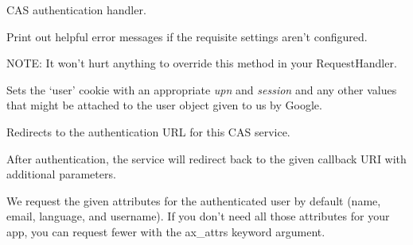 \documentclass[letterpaper,10pt,openany]{sphinxmanual}
\begin{document}
\begin{fulllineitems}
\label{Developer/authentication:gateone.auth.authentication.CASAuthHandler}
CAS authentication handler.

\begin{fulllineitems}
\label{Developer/authentication:gateone.auth.authentication.CASAuthHandler.initialize}
Print out helpful error messages if the requisite settings aren't
configured.

NOTE: It won't hurt anything to override this method in your
RequestHandler.

\end{fulllineitems}


\begin{fulllineitems}
\label{Developer/authentication:gateone.auth.authentication.CASAuthHandler.get}
Sets the `user' cookie with an appropriate \emph{upn} and \emph{session} and any
other values that might be attached to the user object given to us by
Google.

\end{fulllineitems}


\begin{fulllineitems}
\label{Developer/authentication:gateone.auth.authentication.CASAuthHandler.authenticate_redirect}
Redirects to the authentication URL for this CAS service.

After authentication, the service will redirect back to the given
callback URI with additional parameters.

We request the given attributes for the authenticated user by
default (name, email, language, and username). If you don't need
all those attributes for your app, you can request fewer with
the ax\_attrs keyword argument.

\end{fulllineitems}


\end{fulllineitems}
\end{document}

